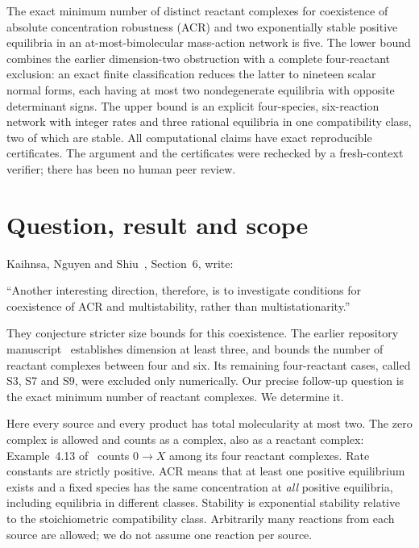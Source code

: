 \documentclass[11pt,a4paper]{report}
\begin{document}
\makepapertitle
\begin{paperabstract}
The exact minimum number of distinct reactant complexes for coexistence of absolute concentration
robustness (ACR) and two exponentially stable positive equilibria in an at-most-bimolecular mass-action
network is five. The lower bound combines the earlier dimension-two obstruction with a complete
four-reactant exclusion: an exact finite classification reduces the latter to nineteen scalar normal
forms, each having at most two nondegenerate equilibria with opposite determinant signs. The upper
bound is an explicit four-species, six-reaction network with integer rates and three rational equilibria
in one compatibility class, two of which are stable. All computational claims have exact reproducible
certificates. The argument and the certificates were rechecked by a fresh-context verifier; there has
been no human peer review.
\end{paperabstract}

\section*{Question, result and scope}
Kaihnsa, Nguyen and Shiu~\autocite{KNS2024}, Section~6, write:
\begin{openquote}
``Another interesting direction, therefore, is to investigate conditions for coexistence of ACR and
multistability, rather than multistationarity.''
\end{openquote}
They conjecture stricter size bounds for this coexistence. The earlier repository manuscript~\autocite{Prior2026}
establishes dimension at least three, and bounds the number of reactant complexes between four and six.
Its remaining four-reactant cases, called S3, S7 and S9, were excluded only numerically.
Our precise follow-up question is the exact minimum number of reactant complexes. We determine it.

Here every source and every product has total molecularity at most two. The zero complex is allowed
and counts as a complex, also as a reactant complex: Example~4.13 of~\autocite{KNS2024} counts
$0\to X$ among its four reactant complexes. Rate constants are strictly positive. ACR means that at least one positive equilibrium exists and a fixed species has the same
concentration at \emph{all} positive equilibria, including equilibria in different classes. Stability is
exponential stability relative to the stoichiometric compatibility class. Arbitrarily many reactions from
each source are allowed; we do not assume one reaction per source.
\end{document}
